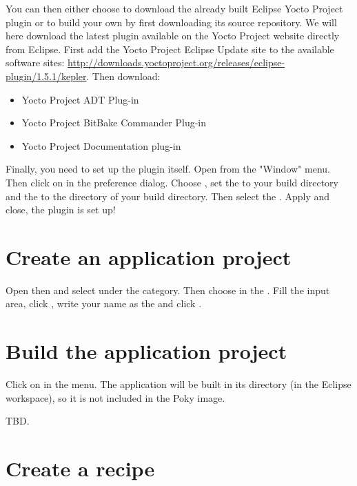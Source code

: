 You can then either choose to download the already built Eclipse Yocto Project
plugin or to build your own by first downloading its source repository. We will
here download the latest plugin available on the Yocto Project website directly
from Eclipse.
First add the Yocto Project Eclipse Update site to the available software sites:
\url{http://downloads.yoctoproject.org/releases/eclipse-plugin/1.5.1/kepler}.
Then download:
\begin{itemize}
  \item Yocto Project ADT Plug-in
  \item Yocto Project BitBake Commander Plug-in
  \item Yocto Project Documentation plug-in
\end{itemize}

Finally, you need to set up the plugin itself. Open  from the
"Window" menu. Then click on  in the preference dialog.
Choose , set the  to your build directory and the  to the
 directory of your build directory. Then select the
. Apply and close, the plugin is set up!

\section{Create an application project}

Open  then  and select  under the
 category. Then choose  in the . Fill the
 input area, click , write your name as the
 and click .

\section{Build the application project}

Click on  in the  menu. The application will
be built in its directory (in the Eclipse workspace), so it is not included in
the Poky image.

TBD.

\section{Create a recipe}

